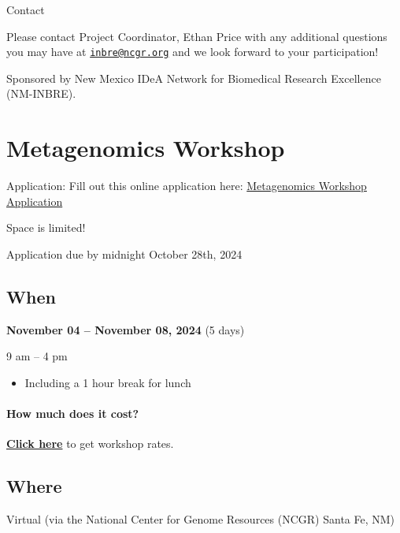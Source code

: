 \documentclass[
]{book}
\providecommand{\tightlist}{%
  \setlength{\itemsep}{0pt}\setlength{\parskip}{0pt}}
\begin{document}
Contact

Please contact Project Coordinator, Ethan Price with any additional questions you may have at \href{mailto:inbre@ncgr.org}{\nolinkurl{inbre@ncgr.org}} and we look forward to your participation!

Sponsored by New Mexico IDeA Network for Biomedical Research Excellence (NM-INBRE).

\hypertarget{metagenomics-workshop}{%
\chapter*{Metagenomics Workshop}\label{metagenomics-workshop}}

Application: Fill out this online application here: \href{https://forms.gle/Ai2psNtZJRvxygZZ9}{Metagenomics Workshop Application}

Space is limited!

Application due by midnight October 28th, 2024

\hypertarget{when-4}{%
\section*{When}\label{when-4}}

\textbf{November 04 -- November 08, 2024} (5 days)

9 am -- 4 pm

\begin{itemize}
\tightlist
\item
  Including a 1 hour break for lunch
\end{itemize}

\hypertarget{how-much-does-it-cost-4}{%
\subsubsection*{How much does it cost?}\label{how-much-does-it-cost-4}}

\href{https://inbre.ncgr.org/ncgr-workshops/workshop-rates.html}{\textbf{Click here}} to get workshop rates.

\hypertarget{where-2}{%
\section*{Where}\label{where-2}}

Virtual (via the National Center for Genome Resources (NCGR) Santa Fe, NM)
\end{document}
